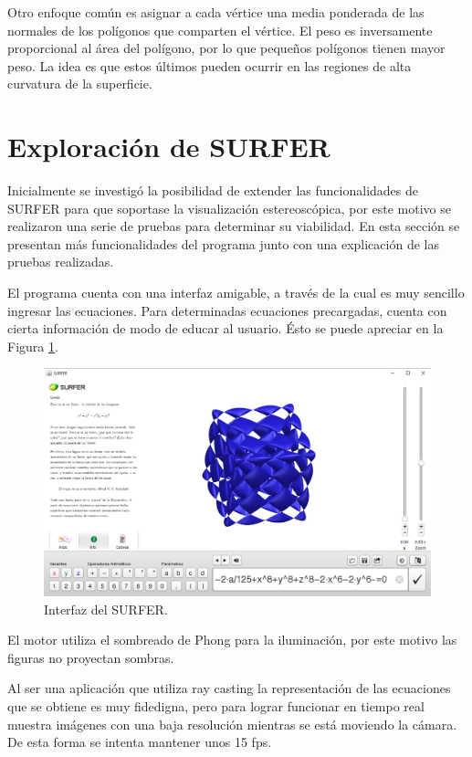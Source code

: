 \documentclass[12pt]{article}
\begin{document}
Otro enfoque común es asignar a cada vértice una media ponderada de las normales de los polígonos que comparten el vértice. El peso es  inversamente proporcional al área del polígono, por lo que pequeños polígonos tienen mayor peso. La idea es que estos últimos pueden ocurrir en las regiones de alta curvatura de la superficie.

\clearpage
\section{Exploración de SURFER}
\noindent Inicialmente se investigó la posibilidad de extender las funcionalidades de SURFER para que soportase la visualización estereoscópica, por este motivo se realizaron una serie de pruebas para determinar su viabilidad. En esta sección se presentan más funcionalidades del programa junto con una explicación de las pruebas realizadas.

El programa cuenta con una interfaz amigable, a través de la cual es muy sencillo ingresar las ecuaciones. Para determinadas ecuaciones precargadas, cuenta con cierta información de modo de educar al usuario. Ésto se puede apreciar en la Figura \ref{interfazSURFER}.

\begin{figure}[h]
\includegraphics[width=\textwidth]{surfer_interfaz.png}
\caption{Interfaz del SURFER.}
\label{interfazSURFER}
\end{figure}

El motor utiliza el sombreado de Phong\cite{Phong} para la iluminación, por este motivo las figuras no proyectan sombras.

Al ser una aplicación que utiliza ray casting la representación de las ecuaciones que se obtiene es muy fidedigna, pero para lograr funcionar en tiempo real muestra imágenes con una baja resolución mientras se está moviendo la cámara. De esta forma se intenta mantener unos 15 fps.
\end{document}
